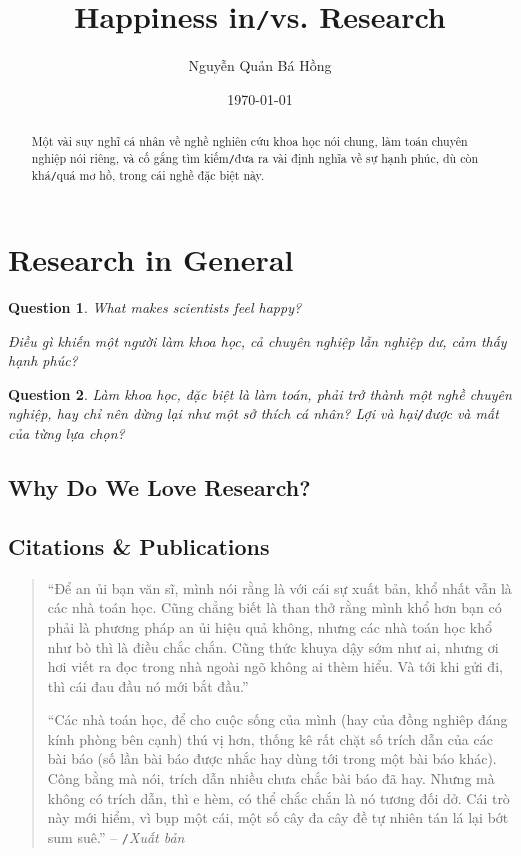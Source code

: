 \documentclass{article}
\title{Happiness in\texttt{/}vs. Research}
\author{Nguyễn Quản Bá Hồng}
\date{\today}
\numberwithin{equation}{section}
\newtheorem{ques}{Question}[section]
\begin{document}
\maketitle
\begin{abstract}
	Một vài suy nghĩ cá nhân về nghề nghiên cứu khoa học nói chung, làm toán chuyên nghiệp nói riêng, và cố gắng tìm kiếm\texttt{/}đưa ra vài định nghĩa về sự hạnh phúc, dù còn khá\texttt{/}quá mơ hồ, trong cái nghề đặc biệt này.
\end{abstract}
\tableofcontents


\section{Research in General}
\begin{ques}
	What makes scientists feel happy?
	
	Điều gì khiến một người làm khoa học, cả chuyên nghiệp lẫn nghiệp dư, cảm thấy hạnh phúc?
\end{ques}

\begin{ques}
	Làm khoa học, đặc biệt là làm toán, phải trở thành một nghề chuyên nghiệp, hay chỉ nên dừng lại như một sở thích cá nhân? Lợi và hại\texttt{/}được và mất của từng lựa chọn?
\end{ques}

\subsection{Why Do We Love Research?}

\subsection{Citations \& Publications}
\begin{quotation}
	``Để an ủi bạn văn sĩ, mình nói rằng là với cái sự xuất bản, khổ nhất vẫn là các nhà toán học. Cũng chẳng  biết là than thở rằng mình khổ hơn bạn có phải là phương pháp an ủi hiệu quả không, nhưng  các nhà toán học khổ như bò thì là điều chắc chắn. Cũng thức khuya dậy sớm như ai, nhưng ơi hơi  viết ra đọc trong nhà ngoài ngõ không ai thèm hiểu. Và tới khi gửi đi, thì cái đau đầu nó mới bắt đầu.''
	
	``Các nhà toán học, để cho cuộc sống của mình (hay của đồng nghiêp đáng kính phòng bên cạnh) thú vị  hơn, thống kê rất chặt số trích dẫn của các bài báo (số lần bài báo được  nhắc hay dùng tới trong một bài báo khác). Công bằng mà nói, trích dẫn nhiều chưa chắc bài báo đã hay. Nhưng mà không có trích dẫn, thì e hèm, có thể chắc chắn là nó tương đối dở.  Cái trò này mới hiểm, vì bụp một cái, một số  cây đa cây đề  tự nhiên tán lá lại bớt sum suê.'' -- \cite{VHV's blog}\texttt{/}\textit{Xuất bản}
\end{quotation}
\end{document}

